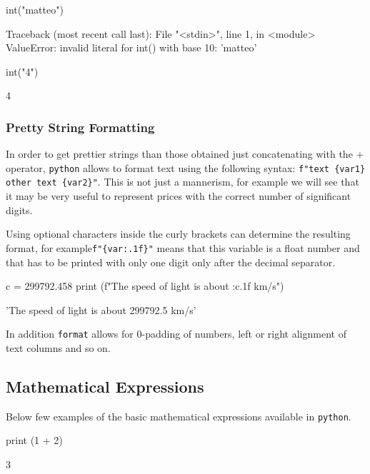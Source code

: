 \begin{ipython}
int("matteo")
\end{ipython}
\begin{ioutput}
Traceback (most recent call last):
  File "<stdin>", line 1, in <module>
ValueError: invalid literal for int() with base 10: 'matteo'
\end{ioutput}

\begin{ipython}
int("4") 
\end{ipython}
\begin{ioutput}
4
\end{ioutput}

\subsubsection{Pretty String Formatting}
In order to get prettier strings than those obtained just concatenating with the + operator, \texttt{python} allows to format text using the following syntax: \texttt{f"text \{var1\} other text \{var2\}"}.
This is not just a mannerism, for example we will see that it may be very useful to represent prices with the correct number of significant digits.

Using optional characters inside the curly brackets can determine the resulting format, for example\texttt{f"\{var:.1f\}"} means that this variable is a float number and that has to be printed with only one digit only after the decimal separator. 

\begin{ipython}
c = 299792.458
print (f"The speed of light is about {:c.1f} km/s")	
\end{ipython}
\begin{ioutput}
'The speed of light is about 299792.5 km/s'
\end{ioutput}

In addition \texttt{format} allows for 0-padding of numbers, left or right alignment of text columns and so on.

\subsection{Mathematical Expressions}\label{mathematical-expressions}

Below few examples of the basic mathematical expressions available in \texttt{python}.

\begin{ipython}
print (1 + 2)	
\end{ipython}
\begin{ioutput}
3
\end{ioutput}

